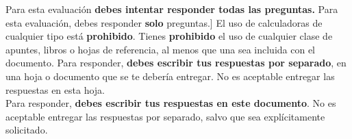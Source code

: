 \begin{coverpages}
\begin{flushleft}
{            
            {Para esta evaluación \textbf{debes intentar responder todas las preguntas.}} %
            {Para esta evaluación, debes responder \textbf{solo}  preguntas.]} %
            {
                El uso de calculadoras de cualquier tipo está \textbf{prohibido}.
            } %
            {
                Tienes \textbf{prohibido} el uso de cualquier clase de apuntes, libros o hojas de referencia, al menos que una sea incluida con el documento.
            }
            {
                Para responder, \textbf{debes escribir tus respuestas por separado}, en una hoja o documento que se te debería entregar. No es aceptable entregar las respuestas en esta hoja.\\[\baselineskip]
            }
            {
                Para responder, \textbf{debes escribir tus respuestas en este documento}. No es aceptable entregar las respuestas por separado, salvo que sea explícitamente solicitado.\\[\baselineskip]
}}
\end{flushleft}
\end{coverpages}
